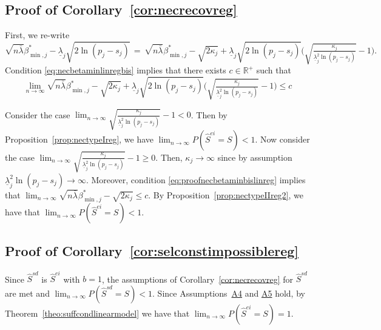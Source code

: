 \documentclass[
  12pt]{article}
\newcommand{\R}{\mathbb{R}}
\begin{document}
\subsection{Proof of Corollary~\ref{cor:necrecovreg}}
 First, we re-write 
 $$\sqrt{n\bar{\lambda}}\beta_{\min,j}^*-\underline{\lambda}_j\sqrt{2\ln(p_j-s_j)} \,=\, \sqrt{n\bar{\lambda}}\beta_{\min,j}^*-\sqrt{2\kappa_j}+\underline{\lambda}_j\sqrt{2\ln(p_j-s_j)}\Big(\sqrt{\tfrac{\kappa_j}{\underline{\lambda}_j^2\ln(p_j-s_j)}}-1\Big).$$ 
 Condition \eqref{eq:necbetaminlinregbis} implies that there exists $c\in\R^+$ such that
  \begin{equation}\label{eq:proofnecbetaminbislinreg}
      \lim_{n\to \infty}\sqrt{n\bar{\lambda}}\beta_{\min,j}^*-\sqrt{2\kappa_j}+\underline{\lambda}_j\sqrt{2\ln(p_j-s_j)}\Big(\sqrt{\tfrac{\kappa_j}{\underline{\lambda}_j^2\ln(p_j-s_j)}}-1\Big)\leq c
  \end{equation}

Consider the case $\lim_{n\to \infty}\sqrt{\tfrac{\kappa_j}{\underline{\lambda}_j^2\ln(p_j-s_j)}}-1<0$. Then by Proposition~\ref{prop:nectypeIreg}, we have $\lim_{n\to \infty}P(\hat{S}^{ei} = S)< 1$. Now consider the case $\lim_{n\to \infty}\sqrt{\tfrac{\kappa_j}{\underline{\lambda}_j^2\ln(p_j-s_j)}}-1 \geq0$. Then, $\kappa_j\to\infty$ since by assumption $\underline{\lambda}^2_j\ln(p_j-s_j)\to\infty$. Moreover, condition \eqref{eq:proofnecbetaminbislinreg} implies that $\lim_{n\to \infty}\sqrt{n\bar{\lambda}}\beta_{\min,j}^*-\sqrt{2\kappa_j} \leq c$. By Proposition~\ref{prop:nectypeIIreg2}, we have that $\lim_{n\to \infty}P(\hat{S}^{ei} = S)< 1$.

\subsection{Proof of Corollary~\ref{cor:selconstimpossiblereg}}
Since $\hat{S}^{sd}$ is $\hat{S}^{ei}$ with $b=1$, the assumptions of Corollary~\ref{cor:necrecovreg} for $\hat{S}^{sd}$ are met and $\lim_{n \to \infty} P(\hat{S}^{sd} = S) < 1$. Since Assumptions~\hyperlink{lab:A4}{A4} and \hyperlink{lab:A5}{A5} hold, by Theorem~\ref{theo:suffcondlinearmodel} we have that $\lim_{n \to \infty} P(\hat{S}^{ei} = S)= 1$.
\end{document}

